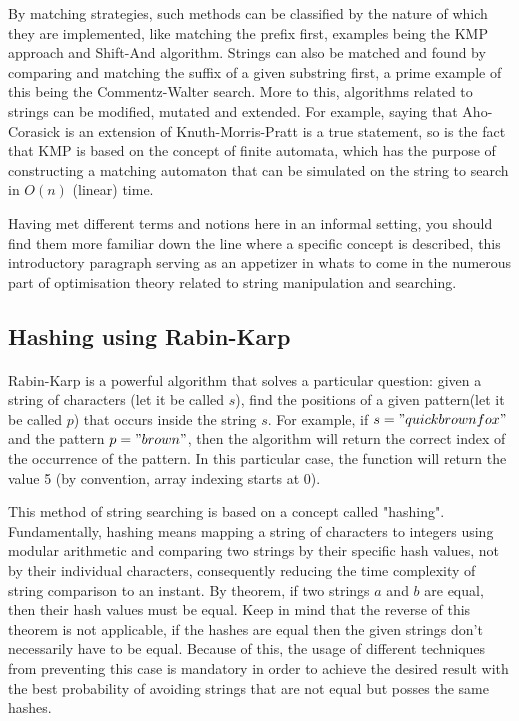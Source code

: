 \documentclass[letterpaper]{article}
\begin{document}
By matching strategies, such methods can be classified by the nature of which they are implemented, like matching the prefix first, examples being the KMP approach and Shift-And algorithm. Strings can also be matched and found by comparing and matching the suffix of a given substring first, a prime example of this being the Commentz-Walter search. More to this, algorithms related to strings can be modified, mutated and extended. For example, saying that Aho-Corasick is an extension of Knuth-Morris-Pratt is a true statement, so is the fact that KMP is based on the concept of finite automata, which has the purpose of constructing a matching automaton that can be simulated on the string to search in $O(n)$ (linear) time. 

Having met different terms and notions here in an informal setting, you should find them more familiar down the line where a specific concept is described, this introductory paragraph serving as an appetizer in whats to come in the numerous part of optimisation theory related to string manipulation and searching. 

\newpage



\subsection{Hashing using Rabin-Karp}

\paragraph{}

Rabin-Karp is a powerful algorithm that solves a particular question: given a string of characters (let it be called $s$), find the positions of a given pattern(let it be called $p$) that occurs inside the string $s$. For example, if $s="quickbrownfox"$ and the pattern $p="brown"$, then the algorithm will return the correct index of the occurrence of the pattern. In this particular case, the function will return the value 5 (by convention, array indexing starts at 0).

This method of string searching is based on a concept called "hashing". Fundamentally, hashing means mapping a string of characters to integers using modular arithmetic and comparing two strings by their specific hash values, not by their individual characters, consequently reducing the time complexity of string comparison to an instant. By theorem, if two strings $a$ and $b$ are equal, then their hash values must be equal. Keep in mind that the reverse of this theorem is not applicable, if the hashes are equal then the given strings don't necessarily have to be equal. Because of this, the usage of different techniques from preventing this case is mandatory in order to achieve the desired result with the best probability of avoiding strings that are not equal but posses the same hashes.
\end{document}
